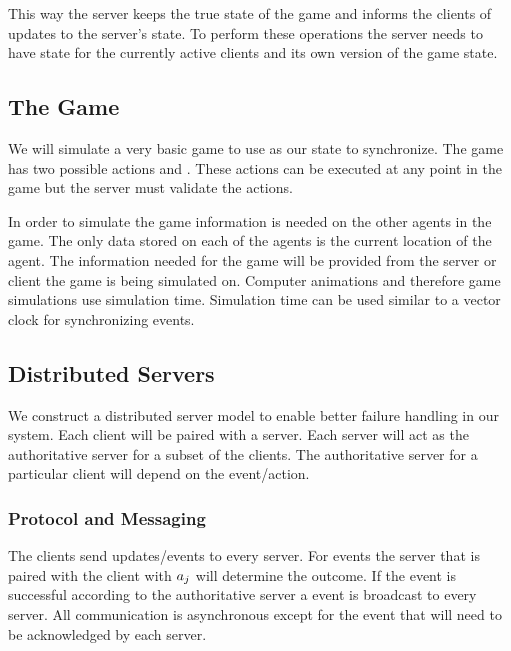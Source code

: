 	This way the server keeps the true state of the game and informs the clients of updates to the server's state. To perform these operations the server needs to have state for the currently active clients and its own version of the game state.

\subsection{The Game}

	We will simulate a very basic game to use as our state to synchronize. 
	The game has two possible actions \move{\agent}{\position} and . These actions can be executed at any point in the game but the server must validate the actions. 
	
	In order to simulate the game information is needed on the other agents in the game. The only data stored on each of the agents is the current location of the agent. The information needed for the game will be provided from the server or client the game is being simulated on. Computer animations and therefore game simulations use simulation time. Simulation time can be used similar to a vector clock for synchronizing events.

\subsection{Distributed Servers}
\label{subsec:distributed-servers}

	
	We construct a distributed server model to enable better failure handling in our system. Each client will be paired with a server. Each server will act as the authoritative server for a subset of the clients. The authoritative server for a particular client will depend on the event/action. 
	
	\subsubsection{Protocol and Messaging}
	
	The clients send updates/events to every server. For  events the server that is paired with the client with $a_{j}$ will determine the outcome. If the  event is successful according to the authoritative server a  event is broadcast to every server. All communication is asynchronous except for the  event that will need to be acknowledged by each server.

